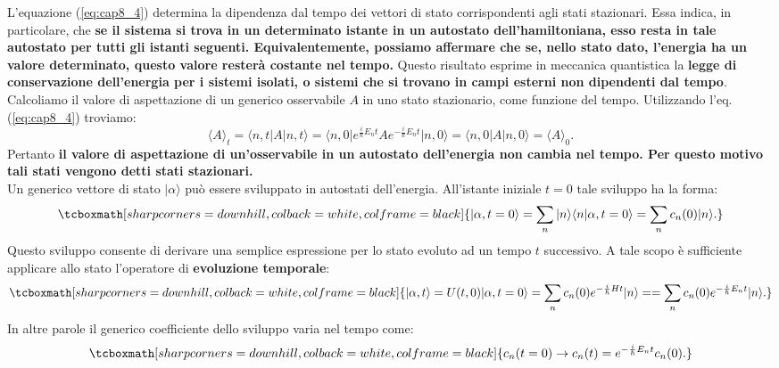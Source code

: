 L'equazione (\ref{eq:cap8_4}) determina la dipendenza dal tempo dei vettori di stato corrispondenti agli stati stazionari. Essa indica, in particolare, che \textbf{se il sistema si trova in un determinato istante in un autostato dell'hamiltoniana, esso resta in tale autostato per tutti gli istanti seguenti. Equivalentemente, possiamo affermare che se, nello stato dato, l'energia ha un valore determinato, questo valore resterà costante nel tempo.} Questo risultato esprime in meccanica quantistica la \textbf{legge di conservazione dell'energia per i sistemi isolati, o sistemi che si trovano in campi esterni non dipendenti dal tempo}.\\

Calcoliamo il valore di aspettazione di un generico osservabile $A$ in uno stato stazionario, come funzione del tempo. Utilizzando l'eq.(\ref{eq:cap8_4}) troviamo:
	\begin{equation}
		\langle A \rangle _t = \langle n, t \vert A \vert n, t \rangle= \langle n, 0 \vert e^{\frac{i}{\hbar}E_n t}A e^{-\frac{i}{\hbar}E_n t}\vert n, 0 \rangle =\langle n, 0 \vert A \vert n, 0 \rangle = \langle A \rangle _0.
	\end{equation}
Pertanto \textbf{il valore di aspettazione di un'osservabile in un autostato dell'energia non cambia nel tempo. Per questo motivo tali stati vengono detti stati stazionari.}\\

Un generico vettore di stato $\vert \alpha \rangle $ può essere sviluppato in autostati dell'energia. All'istante iniziale $t=0$ tale sviluppo ha la forma:
	\begin{equation}
		\tcboxmath[sharp corners=downhill, colback=white, colframe=black]{
			\vert \alpha , t=0\rangle = \sum _n \vert n \rangle \langle n \vert \alpha, t=0 \rangle = \sum _n c_n(0)\vert n \rangle.
			}
	\end{equation}
Questo sviluppo consente di derivare una semplice espressione per lo stato evoluto ad un tempo $t$ successivo. A tale scopo è sufficiente applicare allo stato l'operatore di \textbf{evoluzione temporale}:
	\begin{equation}
		\tcboxmath[sharp corners=downhill, colback=white, colframe=black]{
			\vert \alpha, t \rangle = U (t,0)\vert \alpha, t=0 \rangle = \sum _n c_n (0) e^{-\frac{i}{\hbar}H t}  \vert n \rangle =  =\sum _n c_n (0) e^{-\frac{i}{\hbar}E_n t}  \vert n \rangle.
			}
	\end{equation}
In altre parole il generico coefficiente dello sviluppo varia nel tempo come:
	\begin{equation}
		\tcboxmath[sharp corners=downhill, colback=white, colframe=black]{
			c_n (t=0) \rightarrow c_n(t)=e^{-\frac{i}{\hbar}E_n t} c_n (0).
			}
	\end{equation}\\
	
